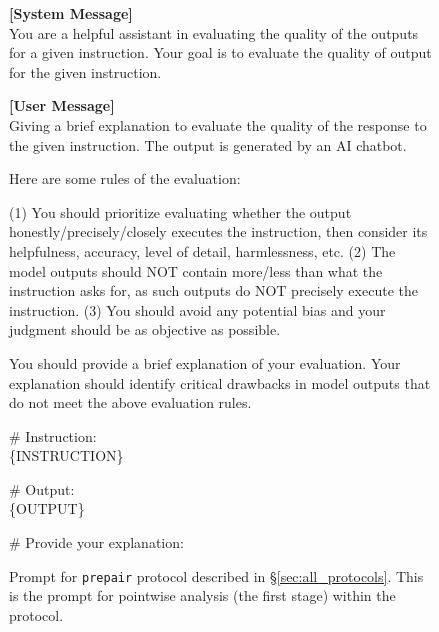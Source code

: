 \begin{figure*}[t!]
\begin{tcolorbox}[colback=black!3!white, colframe=black!70!white, title=Prepair (pointwise analysis), fontupper=\footnotesize, fonttitle=\footnotesize]
\textbf{[System Message]} \\
You are a helpful assistant in evaluating the quality of the outputs for a given instruction. Your goal is to evaluate the quality of output for the given instruction.
\newline

\textbf{[User Message]}\\
Giving a brief explanation to evaluate the quality of the response to the given instruction. The output is generated by an AI chatbot.
\newline

Here are some rules of the evaluation:

(1) You should prioritize evaluating whether the output honestly/precisely/closely executes the instruction, then consider its helpfulness, accuracy, level of detail, harmlessness, etc.
\newline
(2) The model outputs should NOT contain more/less than what the instruction asks for, as such outputs do NOT precisely execute the instruction.
\newline
(3) You should avoid any potential bias and your judgment should be as objective as possible.
\newline


You should provide a brief explanation of your evaluation.
\newline
Your explanation should identify critical drawbacks in model outputs that do not meet the above evaluation rules.
\newline

\# Instruction: \\
\{INSTRUCTION\}
\newline

\# Output: \\
\{OUTPUT\}
\newline

\# Provide your explanation:
\end{tcolorbox}
\caption{Prompt for \texttt{prepair} protocol described in \S\ref{sec:all_protocols}.  This is the prompt for pointwise analysis (the first stage) within the protocol.}
\label{fig:prompt_prepair_pointwise}
\end{figure*}


